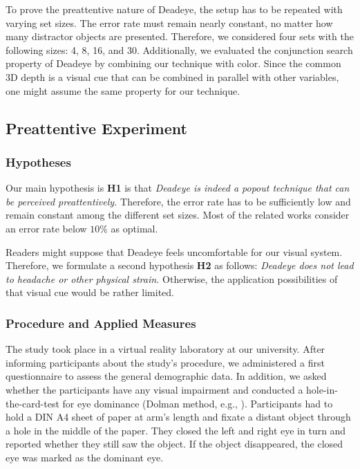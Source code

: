 \documentclass[journal]{vgtc}                %
\begin{document}
To prove the preattentive nature of Deadeye, the setup has to be repeated with varying set sizes. The error rate must remain nearly constant, no matter how many distractor objects are presented. Therefore, we considered four sets with the following sizes: 4, 8, 16, and 30. Additionally, we evaluated the conjunction search property of Deadeye by combining our technique with color. Since the common 3D depth is a visual cue that can be combined in parallel with other variables, one might assume the same property for our technique.



\subsection{Preattentive Experiment}

\subsubsection{Hypotheses}

Our main hypothesis is \textbf{H1} is that \textit{Deadeye is indeed a popout technique that can be perceived preattentively.} Therefore, the error rate has to be sufficiently low and remain constant among the different set sizes. Most of the related works consider an error rate below $10 \%$ as optimal. 

Readers might suppose that Deadeye feels uncomfortable for our visual system. Therefore, we formulate a second hypothesis \textbf{H2} as follows: \textit{Deadeye does not lead to headache or other physical strain.} Otherwise, the application possibilities of that visual cue would be rather limited. 





\subsubsection{Procedure and Applied Measures}

The study took place in a virtual reality laboratory at our university. After informing participants about the study's procedure, we administered a first questionnaire to assess the general demographic data. In addition, we asked whether the participants have any visual impairment and conducted a hole-in-the-card-test for eye dominance (Dolman method, e.g., \cite{cheng2004association, porac1976dominant}). Participants had to hold a DIN A4 sheet of paper at arm's length and fixate a distant object through a hole in the middle of the paper. They closed the left and right eye in turn and reported whether they still saw the object. If the object disappeared, the closed eye was marked as the dominant eye.
\end{document}
